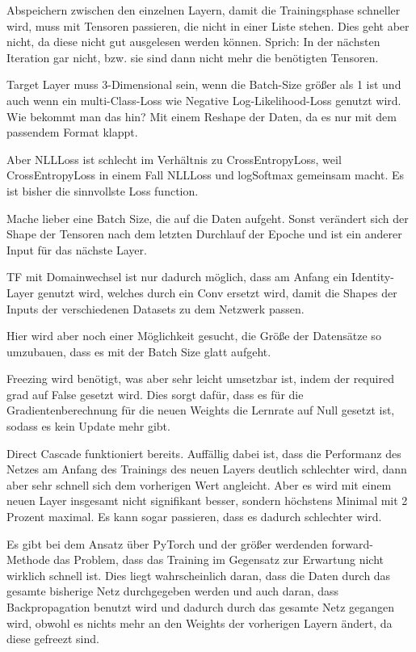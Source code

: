     Abspeichern zwischen den einzelnen Layern, damit die Trainingsphase 
    schneller wird, muss mit Tensoren passieren, die nicht in einer Liste 
    stehen. Dies geht aber nicht, da diese nicht gut ausgelesen werden können. 
    Sprich: In der nächsten Iteration gar nicht, bzw. sie sind dann nicht 
    mehr die benötigten Tensoren.

    Target Layer muss 3-Dimensional sein, wenn die Batch-Size größer als 1 
    ist und auch wenn ein multi-Class-Loss wie Negative Log-Likelihood-Loss 
    genutzt wird. Wie bekommt man das hin?
    Mit einem Reshape der Daten, da es nur mit dem passendem Format klappt. 

    Aber NLLLoss ist schlecht im Verhältnis zu CrossEntropyLoss, weil 
    CrossEntropyLoss in einem Fall NLLLoss und logSoftmax gemeinsam macht.
    Es ist bisher die sinnvollste Loss function.

    Mache lieber eine Batch Size, die auf die Daten aufgeht. Sonst verändert 
    sich der Shape der Tensoren nach dem letzten Durchlauf der Epoche und ist 
    ein anderer Input für das nächste Layer.

    TF mit Domainwechsel ist nur dadurch möglich, dass am Anfang ein 
    Identity-Layer genutzt wird, welches durch ein Conv ersetzt wird, 
    damit die Shapes der Inputs der verschiedenen Datasets zu dem 
    Netzwerk passen.

    Hier wird aber noch einer Möglichkeit gesucht, die Größe der 
    Datensätze so umzubauen, dass es mit der Batch Size glatt aufgeht.

    Freezing wird benötigt, was aber sehr leicht umsetzbar ist, indem 
    der required grad auf False gesetzt wird. Dies sorgt dafür, dass 
    es für die Gradientenberechnung für die neuen Weights die Lernrate 
    auf Null gesetzt ist, sodass es kein Update mehr gibt.

    Direct Cascade funktioniert bereits. Auffällig dabei ist, dass 
    die Performanz des Netzes am Anfang des Trainings des neuen Layers 
    deutlich schlechter wird, dann aber sehr schnell sich dem vorherigen 
    Wert angleicht. Aber es wird mit einem neuen Layer insgesamt nicht 
    signifikant besser, sondern höchstens Minimal mit 2 Prozent maximal. 
    Es kann sogar passieren, dass es dadurch schlechter wird.

    Es gibt bei dem Ansatz über PyTorch und der größer werdenden forward-Methode 
    das Problem, dass das Training im Gegensatz zur Erwartung nicht wirklich 
    schnell ist. Dies liegt wahrscheinlich daran, dass die Daten durch das gesamte 
    bisherige Netz durchgegeben werden und auch daran, dass Backpropagation 
    benutzt wird und dadurch durch das gesamte Netz gegangen wird, obwohl es 
    nichts mehr an den Weights der vorherigen Layern ändert, da diese gefreezt 
    sind. 

